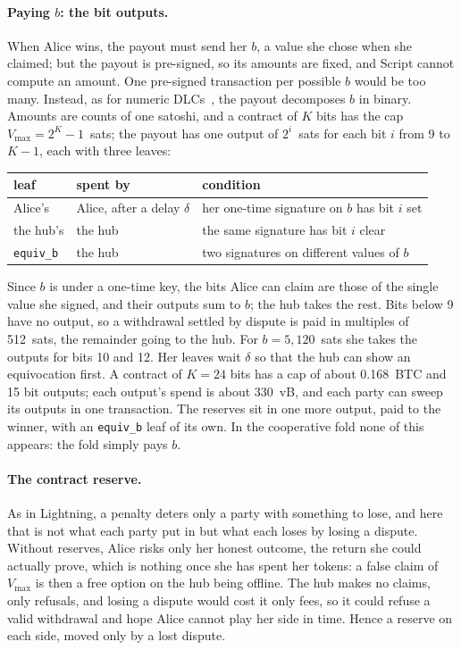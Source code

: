 \documentclass[11pt]{article}
\newcommand{\vmax}{V_{\max}}
\newcommand{\tx}[1]{\texttt{#1}}
\begin{document}
\paragraph{Paying $b$: the bit outputs.} When Alice wins, the payout
must send her $b$, a value she chose when she claimed; but the
payout is pre-signed, so its amounts are fixed, and Script cannot
compute an amount. One pre-signed transaction per possible $b$ would be
too many. Instead, as for numeric DLCs~\cite{dlcnumeric}, the payout decomposes
$b$ in binary. Amounts are counts of one satoshi, and a contract of $K$
bits has the cap $\vmax = 2^K - 1$~sats; the payout has one output of
$2^i$~sats for each bit $i$ from 9 to $K - 1$, each with three leaves:
\begin{center}
\small
\begin{tabular}{lll}
\toprule
leaf & spent by & condition \\
\midrule
Alice's & Alice, after a delay $\delta$ & her one-time signature on $b$ has bit $i$ set \\
the hub's & the hub & the same signature has bit $i$ clear \\
\tx{equiv\_b} & the hub & two signatures on different values of $b$ \\
\bottomrule
\end{tabular}
\end{center}
Since $b$ is under a one-time key, the bits Alice can claim are those of
the single value she signed, and their outputs sum to $b$; the hub takes
the rest. Bits below 9 have no output, so a withdrawal settled by
dispute is paid in multiples of 512~sats, the remainder going to the
hub. For $b = 5{,}120$~sats she takes the outputs for bits 10 and 12.
Her leaves wait $\delta$ so that the hub can show an equivocation first.
A contract of $K = 24$ bits has a cap of about 0.168~BTC and 15 bit
outputs; each output's spend is about 330~vB, and each party can sweep
its outputs in one transaction. The reserves sit in one more output,
paid to the winner, with an \tx{equiv\_b} leaf of its own. In the
cooperative fold none of this appears: the fold simply pays $b$.

\paragraph{The contract reserve.} As in Lightning, a penalty deters only
a party with something to lose, and here that is not what each party put
in but what each loses by losing a dispute. Without reserves, Alice
risks only her honest outcome, the return she could actually prove,
which is nothing once she has spent her tokens: a false claim of $\vmax$
is then a free option on the hub being offline. The hub makes no
claims, only refusals, and losing a dispute would cost it only fees, so
it could refuse a valid withdrawal and hope Alice cannot play her side
in time. Hence a reserve on each side, moved only by a lost dispute.
\end{document}
